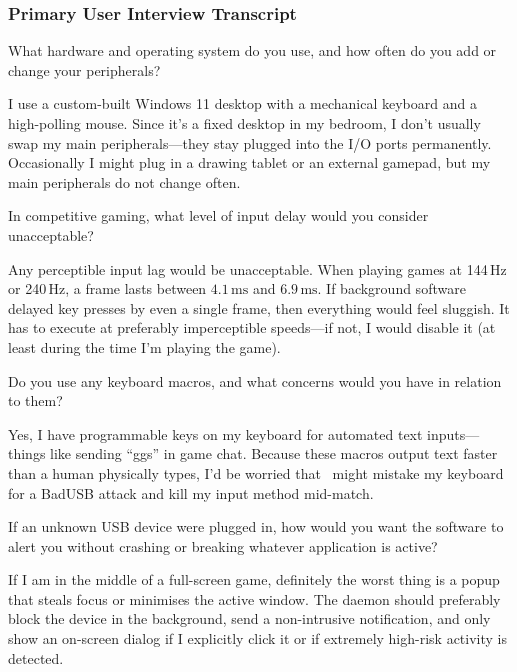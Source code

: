 \subsubsection{Primary User Interview Transcript}

\begin{description}[style=multiline, leftmargin=3.2cm, font=\normalfont\ttfamily\bfseries]
	\item[\stakeholdersME\ (Me):] What hardware and operating system do you use, and how often do you add or change your peripherals?
	\item[\stakeholdersPU:] I use a custom-built Windows 11 desktop with a mechanical keyboard and a high-polling mouse. Since it's a fixed desktop in my bedroom, I don't usually swap my main peripherals---they stay plugged into the I/O ports permanently. Occasionally I might plug in a drawing tablet or an external gamepad, but my main peripherals do not change often.

	\item[\stakeholdersME:] In competitive gaming, what level of input delay would you consider unacceptable?
	\item[\stakeholdersPU:] Any perceptible input lag would be unacceptable. When playing games at 144\,Hz or 240\,Hz, a frame lasts between $4.1\,\text{ms}$ and $6.9\,\text{ms}$. If background software delayed key presses by even a single frame, then everything would feel sluggish. It has to execute at preferably imperceptible speeds---if not, I would disable it (at least during the time I'm playing the game).

	\item[\stakeholdersME:] Do you use any keyboard macros, and what concerns would you have in relation to them?
	\item[\stakeholdersPU:] Yes, I have programmable keys on my keyboard for automated text inputs---things like sending ``ggs'' in game chat. Because these macros output text faster than a human physically types, I’d be worried that \projectNameFormatted\ might mistake my keyboard for a BadUSB attack and kill my input method mid-match.

	\item[\stakeholdersME:] If an unknown USB device were plugged in, how would you want the software to alert you without crashing or breaking whatever application is active?
	\item[\stakeholdersPU:] If I am in the middle of a full-screen game, definitely the worst thing is a popup that steals focus or minimises the active window. The daemon should preferably block the device in the background, send a non-intrusive notification, and only show an on-screen dialog if I explicitly click it or if extremely high-risk activity is detected.


\end{description}

